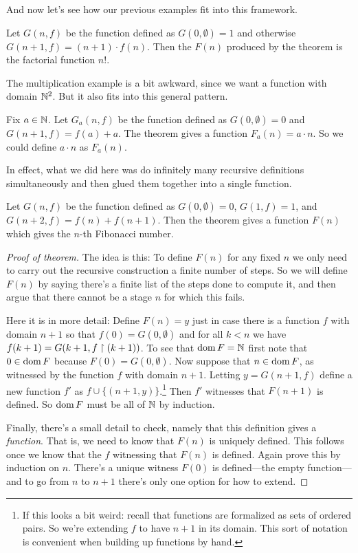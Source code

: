 \documentclass[10pt]{amsart}
\begin{document}
And now let's see how our previous examples fit into this framework.

\begin{example}
Let $G(n,f)$ be the function defined as $G(0,\emptyset) = 1$ and otherwise $G(n+1,f) = (n+1) \cdot f(n)$. Then the $F(n)$ produced by the theorem is the factorial function $n!$.
\end{example}

The multiplication example is a bit awkward, since we want a function with domain $\mathbb{N}^2$. But it also fits into this general pattern.

\begin{example}
Fix $a \in \mathbb{N}$. Let $G_a(n,f)$ be the function defined as $G(0,\emptyset) = 0$ and $G(n+1,f) = f(a) + a$. The theorem gives a function $F_a(n) = a\cdot n$. So we could define $a \cdot n$ as $F_a(n)$. 
\end{example}

In effect, what we did here was do infinitely many recursive definitions simultaneously and then glued them together into a single function.

\begin{example}
Let $G(n,f)$ be the function defined as $G(0,\emptyset) = 0$, $G(1,f) = 1$, and $G(n+2,f) = f(n) + f(n+1)$. Then the theorem gives a function $F(n)$ which gives the $n$-th Fibonacci number.
\end{example}

\begin{proof}[Proof of theorem]
The idea is this: To define $F(n)$ for any fixed $n$ we only need to carry out the recursive construction a finite number of steps. So we will define $F(n)$ by saying there's a finite list of the steps done to compute it, and then argue that there cannot be a stage $n$ for which this fails.

Here it is in more detail: Define $F(n) = y$ just in case there is a function $f$ with domain $n+1$ so that $f(0) = G(0,\emptyset)$ and for all $k < n$ we have $f(k+1) = G(k+1,f \upharpoonright (k+1))$. To see that $\operatorname{dom} F = \mathbb{N}$ first note that $0 \in \operatorname{dom} F$ because $F(0) = G(0,\emptyset)$. Now suppose that $n \in \operatorname{dom} F$, as witnessed by the function $f$ with domain $n+1$. Letting $y = G(n+1,f)$ define a new function $f'$ as $f \cup \{(n+1,y)\}$.\footnote{If this looks a bit weird: recall that functions are formalized as sets of ordered pairs. So we're extending $f$ to have $n+1$ in its domain. This sort of notation is convenient when building up functions by hand.}
Then $f'$ witnesses that $F(n+1)$ is defined. So $\operatorname{dom} F$ must be all of $\mathbb{N}$ by induction.

Finally, there's a small detail to check, namely that this definition gives a \emph{function}. That is, we need to know that $F(n)$ is uniquely defined. This follows once we know that the $f$ witnessing that $F(n)$ is defined. Again prove this by induction on $n$. There's a unique witness $F(0)$ is defined---the empty function---and to go from $n$ to $n+1$ there's only one option for how to extend.
\end{proof}
\end{document}
